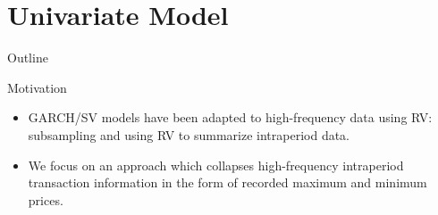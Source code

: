 \documentclass{beamer}
\begin{document}
\section{Univariate Model}
\begin{frame}{Outline}
  \tableofcontents[currentsection]
\end{frame}

\begin{frame}{Motivation}

\begin{itemize}
	\item GARCH/SV models have been adapted to high-frequency data using RV: subsampling and using RV to summarize intraperiod data.

	\item We focus on an approach which collapses high-frequency intraperiod transaction information in the form of recorded maximum and minimum prices.
\end{itemize}
%		 
%	
\end{frame}
\end{document}
